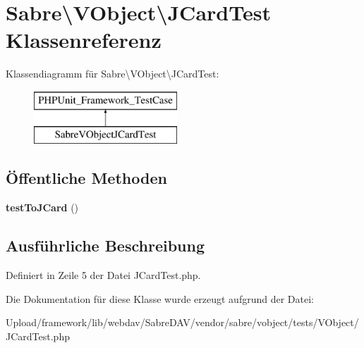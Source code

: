 \hypertarget{class_sabre_1_1_v_object_1_1_j_card_test}{}\section{Sabre\textbackslash{}V\+Object\textbackslash{}J\+Card\+Test Klassenreferenz}
\label{class_sabre_1_1_v_object_1_1_j_card_test}
Klassendiagramm für Sabre\textbackslash{}V\+Object\textbackslash{}J\+Card\+Test\+:\begin{figure}[H]
\begin{center}
\leavevmode
\includegraphics[height=2.000000cm]{class_sabre_1_1_v_object_1_1_j_card_test}
\end{center}
\end{figure}
\subsection*{Öffentliche Methoden}
\begin{DoxyCompactItemize}
\item 
\mbox{\label{class_sabre_1_1_v_object_1_1_j_card_test_a8b0aee0ef2a0427a1052139a610de64d}} 
{\bfseries test\+To\+J\+Card} ()
\end{DoxyCompactItemize}


\subsection{Ausführliche Beschreibung}


Definiert in Zeile 5 der Datei J\+Card\+Test.\+php.



Die Dokumentation für diese Klasse wurde erzeugt aufgrund der Datei\+:\begin{DoxyCompactItemize}
\item 
Upload/framework/lib/webdav/\+Sabre\+D\+A\+V/vendor/sabre/vobject/tests/\+V\+Object/J\+Card\+Test.\+php\end{DoxyCompactItemize}
